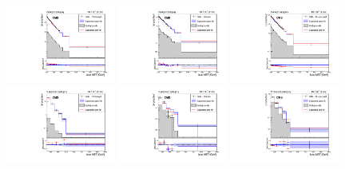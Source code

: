 \begin{figure}[hbtp]\begin{center}
\includegraphics[width=0.32\textwidth]{figures/post_fit_photon_monojet.pdf}
\includegraphics[width=0.32\textwidth]{figures/post_fit_zmm_monojet.pdf}
\includegraphics[width=0.32\textwidth]{figures/post_fit_wmn_monojet.pdf}\\
\includegraphics[width=0.32\textwidth]{figures/post_fit_photon_resolved.pdf}
\includegraphics[width=0.32\textwidth]{figures/post_fit_zmm_resolved.pdf}
\includegraphics[width=0.32\textwidth]{figures/post_fit_wmn_resolved.pdf}\\

\end{center}
\end{figure}

